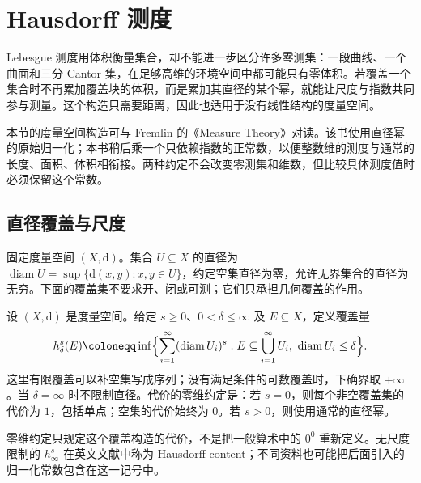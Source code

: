 \section{Hausdorff 测度}
\label{b1:sec:1501}

Lebesgue 测度用体积衡量集合，却不能进一步区分许多零测集：一段曲线、一个曲面和三分 Cantor 集，在足够高维的环境空间中都可能只有零体积。若覆盖一个集合时不再累加覆盖块的体积，而是累加其直径的某个幂，就能让尺度与指数共同参与测量。这个构造只需要距离，因此也适用于没有线性结构的度量空间。

\ProseParagraphBreak

本节的度量空间构造可与 Fremlin 的《Measure Theory》\cite[471A--E and 471J--L]{Fremlin2016Measure}对读。该书使用直径幂的原始归一化；本书稍后乘一个只依赖指数的正常数，以便整数维的测度与通常的长度、面积、体积相衔接。两种约定不会改变零测集和维数，但比较具体测度值时必须保留这个常数。

\subsection{直径覆盖与尺度}
\label{b1:subsec:150101}

固定度量空间 \((X,\mathrm{d})\)。集合 \(U\subseteq X\) 的直径为 \(\operatorname{diam}U=\sup\{\mathrm{d}(x,y):x,y\in U\}\)，约定空集直径为零，允许无界集合的直径为无穷。下面的覆盖集不要求开、闭或可测；它们只承担几何覆盖的作用。

\begin{definition}
\label{b1:def:hausdorff-content}
设 \((X,\mathrm d)\) 是度量空间。给定 \(s\geq0\)、\(0<\delta\leq\infty\) 及 \(E\subseteq X\)，定义覆盖量
\[
h^s_\delta(E)
\coloneqq\inf\Bigl\{\sum_{i=1}^{\infty}(\operatorname{diam}U_i)^s:
E\subseteq\bigcup_{i=1}^{\infty}U_i,
\ \operatorname{diam}U_i\leq\delta\Bigr\}.
\]
这里有限覆盖可以补空集写成序列；没有满足条件的可数覆盖时，下确界取 \(+\infty\)。当 \(\delta=\infty\) 时不限制直径。代价的零维约定是：若 \(s=0\)，则每个非空覆盖集的代价为 \(1\)，包括单点；空集的代价始终为 \(0\)。若 \(s>0\)，则使用通常的直径幂。
\end{definition}

零维约定只规定这个覆盖构造的代价，不是把一般算术中的 \(0^0\) 重新定义。无尺度限制的 \(h^s_\infty\) 在英文文献中称为 Hausdorff content；不同资料也可能把后面引入的归一化常数包含在这一记号中。

